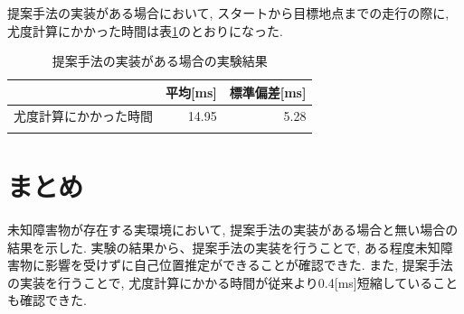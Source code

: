提案手法の実装がある場合において, スタートから目標地点までの走行の際に, 
尤度計算にかかった時間は表\ref{tabule:likelihood_calc_time_imp}のとおりになった. 

\begin{table}[ht]
  \begin{center}
    \caption{提案手法の実装がある場合の実験結果}
    \label{tabule:likelihood_calc_time_imp}
    \begin{tabular}{l|r|r} 
      \thline
      & 平均[ms] &  標準偏差[ms] \\
      \hline
      尤度計算にかかった時間 & 14.95 & 5.28 \\
      \thline
    \end{tabular}
  \end{center}
\end{table}

\section{まとめ}
未知障害物が存在する実環境において, 提案手法の実装がある場合と無い場合の結果を示した. 
実験の結果から、提案手法の実装を行うことで, ある程度未知障害物に影響を受けずに自己位置推定ができることが確認できた. 
また, 提案手法の実装を行うことで, 尤度計算にかかる時間が従来より0.4[ms]短縮していることも確認できた. 